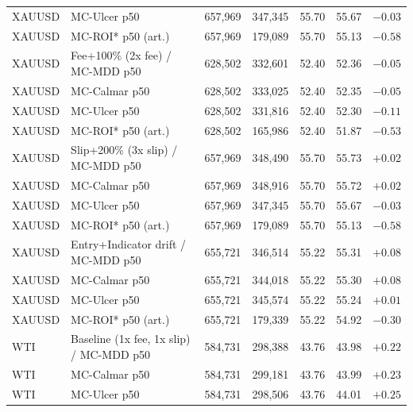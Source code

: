 \begin{table}[ht]
\begin{tabular}{llrrrrr}
XAUUSD & \hspace{1em}MC-Ulcer p50 & 657,969 & 347,345 & 55.70 & 55.67 & $-0.03$ \\
XAUUSD & \hspace{1em}MC-ROI* p50 (art.) & 657,969 & 179,089 & 55.70 & 55.13 & $-0.58$ \\
XAUUSD & Fee+100\% (2x fee) / MC-MDD p50 & 628,502 & 332,601 & 52.40 & 52.36 & $-0.05$ \\
XAUUSD & \hspace{1em}MC-Calmar p50 & 628,502 & 333,025 & 52.40 & 52.35 & $-0.05$ \\
XAUUSD & \hspace{1em}MC-Ulcer p50 & 628,502 & 331,816 & 52.40 & 52.30 & $-0.11$ \\
XAUUSD & \hspace{1em}MC-ROI* p50 (art.) & 628,502 & 165,986 & 52.40 & 51.87 & $-0.53$ \\
XAUUSD & Slip+200\% (3x slip) / MC-MDD p50 & 657,969 & 348,490 & 55.70 & 55.73 & $+0.02$ \\
XAUUSD & \hspace{1em}MC-Calmar p50 & 657,969 & 348,916 & 55.70 & 55.72 & $+0.02$ \\
XAUUSD & \hspace{1em}MC-Ulcer p50 & 657,969 & 347,345 & 55.70 & 55.67 & $-0.03$ \\
XAUUSD & \hspace{1em}MC-ROI* p50 (art.) & 657,969 & 179,089 & 55.70 & 55.13 & $-0.58$ \\
XAUUSD & Entry+Indicator drift / MC-MDD p50 & 655,721 & 346,514 & 55.22 & 55.31 & $+0.08$ \\
XAUUSD & \hspace{1em}MC-Calmar p50 & 655,721 & 344,018 & 55.22 & 55.30 & $+0.08$ \\
XAUUSD & \hspace{1em}MC-Ulcer p50 & 655,721 & 345,574 & 55.22 & 55.24 & $+0.01$ \\
XAUUSD & \hspace{1em}MC-ROI* p50 (art.) & 655,721 & 179,339 & 55.22 & 54.92 & $-0.30$ \\
\midrule
WTI & Baseline (1x fee, 1x slip) / MC-MDD p50 & 584,731 & 298,388 & 43.76 & 43.98 & $+0.22$ \\
WTI & \hspace{1em}MC-Calmar p50 & 584,731 & 299,181 & 43.76 & 43.99 & $+0.23$ \\
WTI & \hspace{1em}MC-Ulcer p50 & 584,731 & 298,506 & 43.76 & 44.01 & $+0.25$ \\

\end{tabular}
\end{table}
